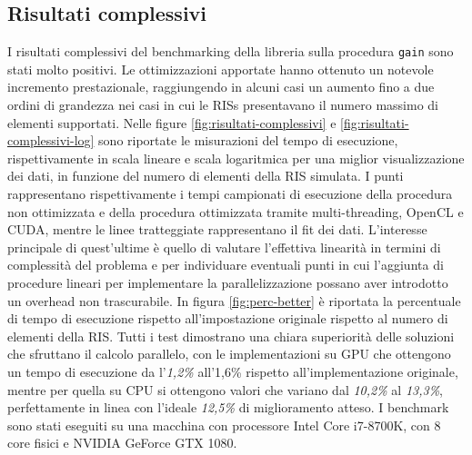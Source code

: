 \subsection{Risultati complessivi}
\label{subsec:risultati-complessivi}

I risultati complessivi del benchmarking della libreria sulla procedura \texttt{gain}
sono stati molto positivi. Le ottimizzazioni apportate hanno ottenuto un notevole
incremento prestazionale, raggiungendo in alcuni casi un aumento fino a due
ordini di grandezza nei casi in cui le RISs presentavano il numero massimo di
elementi supportati. Nelle figure \ref{fig:risultati-complessivi} e \ref{fig:risultati-complessivi-log}
sono riportate le misurazioni del tempo di esecuzione, rispettivamente in scala
lineare e scala logaritmica per una miglior visualizzazione dei dati, in funzione
del numero di elementi della RIS simulata. I punti rappresentano rispettivamente
i tempi campionati di esecuzione della procedura non ottimizzata e della
procedura ottimizzata tramite multi-threading, OpenCL e CUDA, mentre le linee
tratteggiate rappresentano il fit dei dati. L'interesse principale di quest'ultime
è quello di valutare l'effettiva linearità in termini di complessità del problema
e per individuare eventuali punti in cui l'aggiunta di procedure lineari per implementare
la parallelizzazione possano aver introdotto un overhead non trascurabile. In
figura \ref{fig:perc-better} è riportata la percentuale di tempo di esecuzione
rispetto all'impostazione originale rispetto al numero di elementi della RIS. Tutti
i test dimostrano una chiara superiorità delle soluzioni che sfruttano il calcolo
parallelo, con le implementazioni su GPU che ottengono un tempo di esecuzione da
l'\textit{1,2\%} all'{1,6\%} rispetto all'implementazione originale, mentre per
quella su CPU si ottengono valori che variano dal \textit{10,2\%} al \textit{13,3\%},
perfettamente in linea con l'ideale \textit{12,5\%} di miglioramento atteso. I benchmark
sono stati eseguiti su una macchina con processore Intel Core i7-8700K, con 8
core fisici e NVIDIA GeForce GTX 1080.


